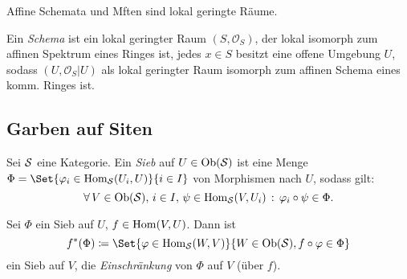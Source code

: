 \documentclass{cheat-sheet}
\renewcommand{\O}{\mathcal{O}} %
\begin{document}
\begin{bspe}
  Affine Schemata und Mften sind lokal geringte Räume.
\end{bspe}


\begin{defn}
  Ein \emph{Schema} ist ein lokal geringter Raum $(S, \O_S)$, der lokal isomorph zum affinen Spektrum eines Ringes ist, \dh{} jedes $x \in S$ besitzt eine offene Umgebung $U$, sodass $(U, \O_S|U)$ als lokal geringter Raum isomorph zum affinen Schema eines komm. Ringes ist.
\end{defn}




\begin{samepage}

\subsection{Garben auf Siten}

\end{samepage}

\begin{defn}
  Sei $\mathcal{S}$ eine Kategorie. Ein \emph{Sieb} auf $U \in \operatorname{Ob}(\mathcal{S})$ ist eine Menge $\Phi = \Set{\varphi_i \in \Hom_\Sit(U_i, U)}{i \in I}$ von Morphismen nach $U$, sodass gilt:
  \[ \forall \, {V \in \operatorname{Ob}(\mathcal{S}), \, i \in I, \, \psi \in \operatorname{Hom}_{\mathcal{S}}(V, U_i)} \,:\, \varphi_i \circ \psi \in \Phi. \]
\end{defn}

\begin{bem}
  Sei $\Phi$ ein Sieb auf $U$, $f \in \operatorname{Hom}(V, U)$. Dann ist
  \[ f^*(\Phi) \coloneqq \Set{\varphi \in \Hom_\Sit(W, V)}{W \in \Ob(\Sit), f \circ \varphi \in \Phi} \]
  ein Sieb auf $V$, die \emph{Einschränkung} von $\Phi$ auf $V$ (über $f$).
\end{bem}
\end{document}
